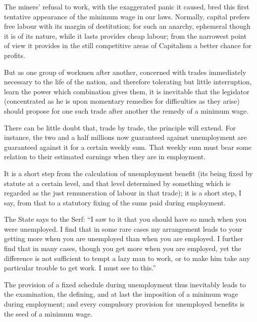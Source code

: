 \documentclass{book}
\begin{document}
The miners’ refusal to work, with the exaggerated panic it caused, bred this first tentative appearance of the minimum wage in our laws. Normally, capital prefers free labour with its margin of destitution; for such an anarchy, ephemeral though it is of its nature, while it lasts provides cheap labour; from the narrowest point of view it provides in the still competitive areas of Capitalism a better chance for profits.

But as one group of workmen after another, concerned with trades immediately necessary to the life of the nation, and therefore tolerating but little interruption, learn the power which combination gives them, it is inevitable that the legislator (concentrated as he is upon momentary remedies for difficulties as they arise) should propose for one such trade after another the remedy of a minimum wage.

There can be little doubt that, trade by trade, the principle will extend. For instance, the two and a half millions now guaranteed against unemployment are guaranteed against it for a certain weekly sum. That weekly sum must bear some relation to their estimated earnings when they are in employment.

It is a short step from the calculation of unemployment benefit (its being fixed by statute at a certain level, and that level determined by something which is regarded as the just remuneration of labour in that trade); it is a short step, I say, from that to a statutory fixing of the sums paid during employment.

The State says to the Serf: “I saw to it that you should have so much when you were unemployed. I find that in some rare cases my arrangement leads to your getting more when you are unemployed than when you are employed. I further find that in many cases, though you get more when you are employed, yet the difference is not sufficient to tempt a lazy man to work, or to make him take any particular trouble to get work. I must see to this.”

The provision of a fixed schedule during unemployment thus inevitably leads to the examination, the defining, and at last the imposition of a minimum wage during employment; and every compulsory provision for unemployed benefits is the seed of a minimum wage.
\end{document}
